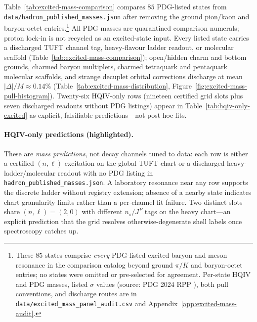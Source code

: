 \documentclass[11pt]{amsart}
\begin{document}
Table~\ref{tab:excited-mass-comparison} compares $85$ PDG-listed states from
\texttt{data/hadron\_published\_masses.json} after removing the ground pion/kaon
and baryon-octet entries.\footnote{%
These $85$ states comprise \emph{every} PDG-listed excited baryon and meson resonance
in the comparison catalog beyond ground $\pi/K$ and baryon-octet entries; no states
were omitted or pre-selected for agreement.
Per-state HQIV and PDG masses, listed $\sigma$ values (source: PDG 2024 RPP
\cite{pdg2024}), both pull conventions, and discharge routes are in
\texttt{data/excited\_mass\_panel\_audit.csv} and Appendix~\ref{app:excited-mass-audit}.}
All PDG masses are quarantined comparison numerals; proton lock-in is not recycled
as an excited-state input.
Every listed state carries a discharged TUFT channel tag, heavy-flavour ladder readout,
or molecular scaffold (Table~\ref{tab:excited-mass-comparison}); open/hidden charm and
bottom grounds, charmed baryon multiplets, charmed tetraquark and pentaquark molecular
scaffolds, and strange decuplet orbital corrections discharge at mean $|\Delta|/M
\approx 0.14\%$ (Table~\ref{tab:excited-mass-distribution}, Figure~\ref{fig:excited-mass-pull-histogram}).
Twenty-six HQIV-only rows (nineteen certified grid slots plus seven discharged
readouts without PDG listings) appear in Table~\ref{tab:hqiv-only-excited} as explicit,
falsifiable predictions---not post-hoc fits.

\paragraph{HQIV-only predictions (highlighted).}
These are \emph{mass predictions}, not decay channels tuned to data: each row is either
a certified $(n,\ell)$ excitation on the global TUFT chart or a discharged
heavy-ladder/molecular readout with no PDG listing in \texttt{hadron\_published\_masses.json}.
A laboratory resonance near any row supports the discrete ladder without registry
extension; absence of a nearby state indicates chart granularity limits rather than a
per-channel fit failure.
Two distinct slots share $(n,\ell)=(2,0)$ with different $n_s/J^P$ tags on the
heavy chart---an explicit prediction that the grid resolves otherwise-degenerate
shell labels once spectroscopy catches up.






\end{document}
